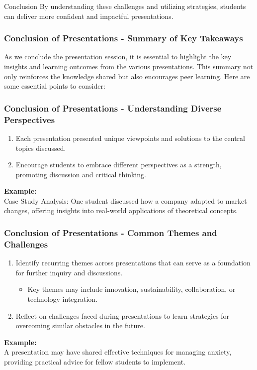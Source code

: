 \documentclass[aspectratio=169]{beamer}
\begin{document}
\begin{frame}[fragile]
    \begin{block}{Conclusion}
        By understanding these challenges and utilizing strategies, students can deliver more confident and impactful presentations.
    \end{block}
\end{frame}

\begin{frame}[fragile]
    \frametitle{Conclusion of Presentations - Summary of Key Takeaways}
    As we conclude the presentation session, it is essential to highlight the key insights and learning outcomes from the various presentations. This summary not only reinforces the knowledge shared but also encourages peer learning. Here are some essential points to consider:
\end{frame}

\begin{frame}[fragile]
    \frametitle{Conclusion of Presentations - Understanding Diverse Perspectives}
    \begin{enumerate}
        \item Each presentation presented unique viewpoints and solutions to the central topics discussed.
        \item Encourage students to embrace different perspectives as a strength, promoting discussion and critical thinking.
    \end{enumerate}
    
    \textbf{Example:} \\
    Case Study Analysis: One student discussed how a company adapted to market changes, offering insights into real-world applications of theoretical concepts.
\end{frame}

\begin{frame}[fragile]
    \frametitle{Conclusion of Presentations - Common Themes and Challenges}
    \begin{enumerate}
        \item Identify recurring themes across presentations that can serve as a foundation for further inquiry and discussions.
        \begin{itemize}
            \item Key themes may include innovation, sustainability, collaboration, or technology integration.
        \end{itemize}
        \item Reflect on challenges faced during presentations to learn strategies for overcoming similar obstacles in the future.
    \end{enumerate}
    
    \textbf{Example:} \\
    A presentation may have shared effective techniques for managing anxiety, providing practical advice for fellow students to implement.
\end{frame}
\end{document}
